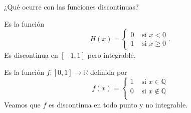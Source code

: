  
¿Qué ocurre con las funciones discontinuas? 

\begin{ejemplo} Es la función
\[
 H(x)=\begin{cases}0 & \text{ si } x<0\\1 & \text{ si } x\geq 0\end{cases}.
\]
Es discontinua en $[-1,1]$ pero integrable.
 
\end{ejemplo}



\begin{ejemplo} Es la función $f:[0,1]\to\mathbb{R}$ definida por 
\[
 f(x)=\begin{cases} 1 & \text{ si } x\in\mathbb{Q}\\0 & \text{ si }   x\notin\mathbb{Q}\\
\end{cases}
\]
Veamos que $f$ es discontinua en todo punto y no integrable.
\end{ejemplo}





